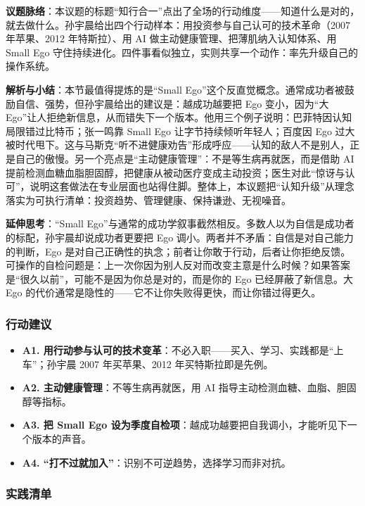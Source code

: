 \textbf{议题脉络}：本议题的标题``知行合一''点出了全场的行动维度------知道什么是对的，就去做什么。孙宇晨给出四个行动样本：用投资参与自己认可的技术革命（2007
年苹果、2012 年特斯拉）、用 AI 做主动健康管理、把薄肌纳入认知体系、用
Small Ego
守住持续进化。四件事看似独立，实则共享一个动作：率先升级自己的操作系统。

\textbf{解析与小结}：本节最值得提炼的是``Small
Ego''这个反直觉概念。通常成功者被鼓励自信、强势，但孙宇晨给出的建议是：越成功越要把
Ego 变小，因为``大
Ego''让人拒绝新信息，从而错失下一个版本。他用三个例子说明：巴菲特因认知局限错过比特币；张一鸣靠
Small Ego 让字节持续倾听年轻人；百度因 Ego
过大被时代甩下。这与马斯克``听不进健康劝告''形成呼应------认知的敌人不是别人，正是自己的傲慢。另一个亮点是``主动健康管理''：不是等生病再就医，而是借助
AI
提前检测血糖血脂胆固醇，把健康从被动医疗变成主动投资；医生对此``惊讶与认可''，说明这套做法在专业层面也站得住脚。整体上，本议题把``认知升级''从理念落实为可执行清单：投资趋势、管理健康、保持谦逊、无视噪音。

\textbf{延伸思考}：``Small
Ego''与通常的成功学叙事截然相反。多数人以为自信是成功者的标配，孙宇晨却说成功者更要把
Ego 调小。两者并不矛盾：自信是对自己能力的判断，Ego
是对自己正确性的执念；前者让你敢于行动，后者让你拒绝反馈。可操作的自检问题是：上一次你因为别人反对而改变主意是什么时候？如果答案是``很久以前''，可能不是因为你总是对的，而是你的
Ego 已经屏蔽了新信息。大 Ego
的代价通常是隐性的------它不让你失败得更快，而让你错过得更久。

\subsubsection{行动建议}

\begin{itemize}
\tightlist
\item
  \textbf{A1.
  用行动参与认可的技术变革}：不必入职------买入、学习、实践都是``上车''；孙宇晨
  2007 年买苹果、2012 年买特斯拉即是先例。
\item
  \textbf{A2. 主动健康管理}：不等生病再就医，用 AI
  指导主动检测血糖、血脂、胆固醇等指标。
\item
  \textbf{A3. 把 Small Ego
  设为季度自检项}：越成功越要把自我调小，才能听见下一个版本的声音。
\item
  \textbf{A4. ``打不过就加入''}：识别不可逆趋势，选择学习而非对抗。
\end{itemize}

\subsubsection{实践清单}

